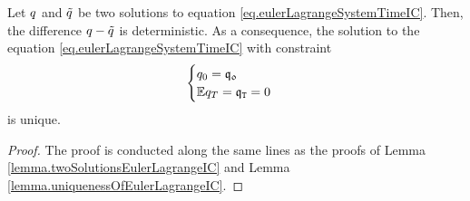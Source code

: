 \documentclass[10pt,a4paper]{article}
\begin{document}
\begin{lemma}\label{lemma.uniquenessOfSolutionEulerLagrangeTimeIC}
Let $q$ and $\tilde{q}$ be two solutions to equation \eqref{eq.eulerLagrangeSystemTimeIC}. Then, the difference $q - \tilde{q}$ is deterministic. As a consequence, the solution to the equation \eqref{eq.eulerLagrangeSystemTimeIC} with constraint
\begin{equation}\label{eq.initialAndTerminalCOnditionsTimeIC}
\begin{cases}
q_0 = \mathfrak{q_0} \\
\mathbb{{E}} q_T = \mathfrak{q}_{\mathtt{T} } = 0 
\end{cases}
\end{equation}
is unique.
\end{lemma}
\begin{proof}
The proof is conducted along the same lines as the proofs of Lemma \ref{lemma.twoSolutionsEulerLagrangeIC} and Lemma \ref{lemma.uniquenessOfEulerLagrangeIC}. 
\end{proof}
\end{document}
